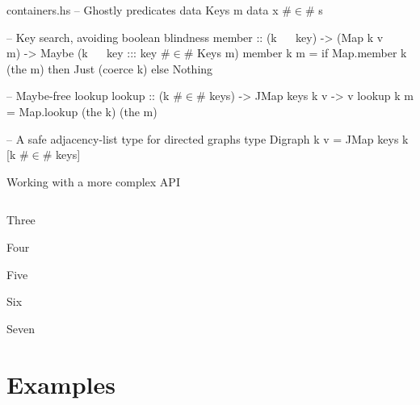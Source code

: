 \documentclass{beamer}
\begin{document}
\begin{filecontents*}{containers.hs}
-- Ghostly predicates
data Keys m
data x #$\in$# s

-- Key search, avoiding boolean blindness
member :: (k ~~ key)
       -> (Map k v ~~ m)
       -> Maybe (k ~~ key ::: key #$\in$# Keys m)
member k m = if Map.member k (the m)
               then Just (coerce k)
               else Nothing
               
-- Maybe-free lookup
lookup :: (k #$\in$# keys) -> JMap keys k v -> v
lookup k m = Map.lookup (the k) (the m)

-- A safe adjacency-list type for directed graphs
type Digraph k v = JMap keys k [k #$\in$# keys]
\end{filecontents*}

\begin{frame}{Working with a more complex API}
\inputminted{haskell}{containers.hs}
\end{frame}

\begin{frame}{Three}

\end{frame}


\begin{frame}{Four}

\end{frame}

\begin{frame}{Five}

\end{frame}

\begin{frame}{Six}

\end{frame}


\begin{frame}{Seven}

\end{frame}

  \section{Examples}   %
\end{document}
